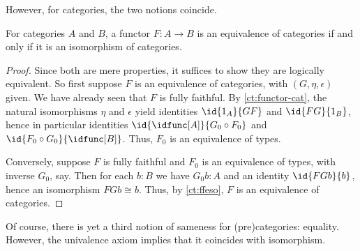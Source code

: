 However, for categories, the two notions coincide.

\begin{lem}\label{ct:eqv-levelwise}
  For categories $A$ and $B$, a functor $F:A\to B$ is an equivalence of categories if and only if it is an isomorphism of categories.
\end{lem}
\begin{proof}
  Since both are mere properties, it suffices to show they are logically equivalent.
  So first suppose $F$ is an equivalence of categories, with $(G,\eta,\epsilon)$ given.
  We have already seen that $F$ is fully faithful.
  By \cref{ct:functor-cat}, the natural isomorphisms $\eta$ and $\epsilon$ yield identities $\id{1_A}{GF}$ and $\id{FG}{1_B}$, hence in particular identities $\id{\idfunc[A]}{G_0\circ F_0}$ and $\id{F_0\circ G_0}{\idfunc[B]}$.
Thus, $F_0$ is an equivalence of types.

  Conversely, suppose $F$ is fully faithful and $F_0$ is an equivalence of types, with inverse $G_0$, say.
  Then for each $b:B$ we have $G_0 b:A$ and an identity $\id{FGb}{b}$, hence an isomorphism $FGb\cong b$.
  Thus, by \cref{ct:ffeso}, $F$ is an equivalence of categories.
\end{proof}

Of course, there is yet a third notion of sameness for (pre)categories: equality.
However, the univalence axiom implies that it coincides with isomorphism.

